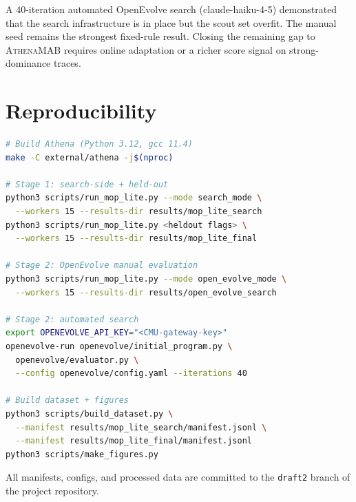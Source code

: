 \documentclass[10pt,twocolumn]{article}
\begin{document}
A 40-iteration automated OpenEvolve search (claude-haiku-4-5) demonstrated that the
search infrastructure is in place but the scout set overfit. The manual seed remains
the strongest fixed-rule result. Closing the remaining gap to \textsc{AthenaMAB}
requires online adaptation or a richer score signal on strong-dominance traces.

\section*{Reproducibility}

\begin{lstlisting}[language=bash, caption={Commands to reproduce all results.}]
# Build Athena (Python 3.12, gcc 11.4)
make -C external/athena -j$(nproc)

# Stage 1: search-side + held-out
python3 scripts/run_mop_lite.py --mode search_mode \
  --workers 15 --results-dir results/mop_lite_search
python3 scripts/run_mop_lite.py <heldout flags> \
  --workers 15 --results-dir results/mop_lite_final

# Stage 2: OpenEvolve manual evaluation
python3 scripts/run_mop_lite.py --mode open_evolve_mode \
  --workers 15 --results-dir results/open_evolve_search

# Stage 2: automated search
export OPENEVOLVE_API_KEY="<CMU-gateway-key>"
openevolve-run openevolve/initial_program.py \
  openevolve/evaluator.py \
  --config openevolve/config.yaml --iterations 40

# Build dataset + figures
python3 scripts/build_dataset.py \
  --manifest results/mop_lite_search/manifest.jsonl \
  --manifest results/mop_lite_final/manifest.jsonl
python3 scripts/make_figures.py
\end{lstlisting}

All manifests, configs, and processed data are committed to the
\texttt{draft2} branch of the project repository.
\end{document}
